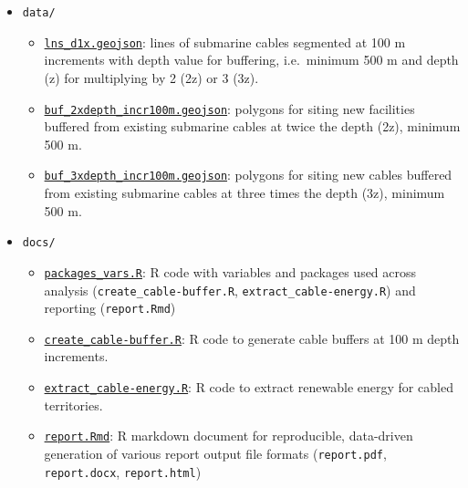 \documentclass[]{article}
\providecommand{\tightlist}{%
  \setlength{\itemsep}{0pt}\setlength{\parskip}{0pt}}
\begin{document}
\begin{itemize}
\tightlist
\item
  \texttt{data/}

  \begin{itemize}
  \tightlist
  \item
    \href{https://github.com/ecoquants/nrel-cables/blob/master/data/lns_d1x.geojson}{\texttt{lns\_d1x.geojson}}:
    lines of submarine cables segmented at 100 m increments with depth
    value for buffering, i.e.~minimum 500 m and depth (z) for
    multiplying by 2 (2z) or 3 (3z).
  \item
    \href{https://github.com/ecoquants/nrel-cables/blob/master/data/buf_2xdepth_incr100m.geojson}{\texttt{buf\_2xdepth\_incr100m.geojson}}:
    polygons for siting new facilities buffered from existing submarine
    cables at twice the depth (2z), minimum 500 m.
  \item
    \href{https://github.com/ecoquants/nrel-cables/blob/master/data/buf_3xdepth_incr100m.geojson}{\texttt{buf\_3xdepth\_incr100m.geojson}}:
    polygons for siting new cables buffered from existing submarine
    cables at three times the depth (3z), minimum 500 m.
  \end{itemize}
\item
  \texttt{docs/}

  \begin{itemize}
  \tightlist
  \item
    \href{https://github.com/ecoquants/nrel-cables/blob/master/docs/packages_vars.R}{\texttt{packages\_vars.R}}:
    R code with variables and packages used across analysis
    (\texttt{create\_cable-buffer.R}, \texttt{extract\_cable-energy.R})
    and reporting (\texttt{report.Rmd})
  \item
    \href{https://github.com/ecoquants/nrel-cables/blob/master/docs/create_cable-buffer.R}{\texttt{create\_cable-buffer.R}}:
    R code to generate cable buffers at 100 m depth increments.
  \item
    \href{https://github.com/ecoquants/nrel-cables/blob/master/docs/extract_cable-energy.R}{\texttt{extract\_cable-energy.R}}:
    R code to extract renewable energy for cabled territories.
  \item
    \href{https://github.com/ecoquants/nrel-cables/blob/master/docs/report.Rmd}{\texttt{report.Rmd}}:
    R markdown document for reproducible, data-driven generation of
    various report output file formats (\texttt{report.pdf},
    \texttt{report.docx}, \texttt{report.html})
  \end{itemize}
\end{itemize}
\end{document}

